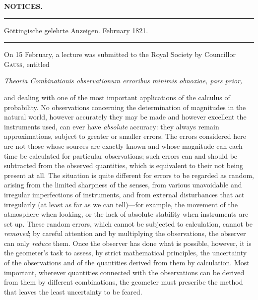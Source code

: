 \clearpage
{}
\begin{center}
{\Large\bfseries NOTICES.}\par
\vspace{1.8em}
\rule{.88\textwidth}{.3pt}\par
Göttingische gelehrte Anzeigen. February 1821.\par
\rule{.88\textwidth}{.3pt}
\end{center}

On 15 February, a lecture was submitted to the Royal Society by Councillor \textsc{Gauss}, entitled
\begin{center}
\textit{Theoria Combinationis observationum erroribus minimis obnoxiae, pars prior,}
\end{center}
\noindent and dealing with one of the most important applications of the calculus of probability. No observations concerning the determination of magnitudes in the natural world, however accurately they may be made and however excellent the instruments used, can ever have \textit{absolute} accuracy: they always remain approximations, subject to greater or smaller errors. The errors considered here are not those whose sources are exactly known and whose magnitude can each time be calculated for particular observations; such errors can and should be subtracted from the observed quantities, which is equivalent to their not being present at all. The situation is quite different for errors to be regarded as random, arising from the limited sharpness of the senses, from various unavoidable and irregular imperfections of instruments, and from external disturbances that act irregularly (at least as far as we can tell)—for example, the movement of the atmosphere when looking, or the lack of absolute stability when instruments are set up. These random errors, which
cannot be subjected to calculation, cannot be \textit{removed}; by careful attention and by multiplying the observations, the observer can only \textit{reduce} them. Once the observer has done what is possible, however, it is the geometer's task to assess, by strict mathematical principles, the uncertainty of the observations and of the quantities derived from them by calculation. Most important, wherever quantities connected with the observations can be derived from them by different combinations, the geometer must prescribe the method that leaves the least uncertainty to be feared.

